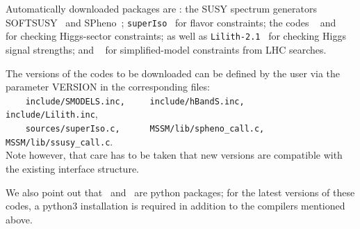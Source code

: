 \documentclass[12pt,a4paper]{article}
\begin{document}
 
Automatically downloaded packages are : 
the SUSY spectrum generators SOFTSUSY~\cite{Allanach:2001kg} and SPheno~\cite{Porod:2011nf}; 
{\tt superIso}~\cite{Mahmoudi:2008tp} for flavor constraints; 
the codes \HB~\cite{Bechtle:2013wla,Bechtle:2020pkv} and \HS~\cite{Bechtle:2013xfa,Bechtle:2020uwn} for checking Higgs-sector constraints; 
as well as 
 {\tt Lilith-2.1}~\cite{Bernon:2015hsa,Kraml:2019sis,Bertrand:2020lyb} for checking Higgs signal strengths;
and 
\smodels~\cite{Kraml:2013mwa,Ambrogi:2017neo,Ambrogi:2018ujg,smodels20} for simplified-model constraints from LHC searches. 
 
The versions of the codes to be downloaded can be defined by the user  via the parameter
VERSION  in the corresponding files:\\[2mm]
 \verb|    include/SMODELS.inc,     include/hBandS.inc,     include/Lilith.inc|,\\
 \verb|    sources/superIso.c,      MSSM/lib/spheno_call.c,  MSSM/lib/ssusy_call.c|.\\[2mm]
Note however, that care has to be taken that new versions are compatible with the existing interface structure.

We also point out that \lilith\ and \smodels\ are python packages; for the latest versions of these codes, a
python3 installation is required in addition to the compilers mentioned above.

\end{document}
